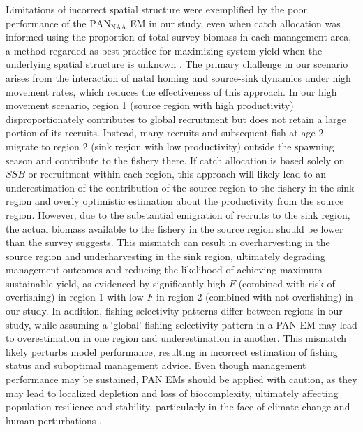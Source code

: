 \documentclass[
  12pt,
]{article}
\begin{document}
Limitations of incorrect spatial structure were exemplified by the poor
performance of the \(\text{PAN}_{\scriptscriptstyle \text{NAA}}\) EM in
our study, even when catch allocation was informed using the proportion
of total survey biomass in each management area, a method regarded as
best practice for maximizing system yield when the underlying spatial
structure is unknown \citep{Bosley2019}. The primary challenge in our
scenario arises from the interaction of natal homing and source-sink
dynamics under high movement rates, which reduces the effectiveness of
this approach. In our high movement scenario, region 1 (source region
with high productivity) disproportionately contributes to global
recruitment but does not retain a large portion of its recruits.
Instead, many recruits and subsequent fish at age 2+ migrate to region 2
(sink region with low productivity) outside the spawning season and
contribute to the fishery there. If catch allocation is based solely on
\(SSB\) or recruitment within each region, this approach will likely
lead to an underestimation of the contribution of the source region to
the fishery in the sink region and overly optimistic estimation about
the productivity from the source region. However, due to the substantial
emigration of recruits to the sink region, the actual biomass available
to the fishery in the source region should be lower than the survey
suggests. This mismatch can result in overharvesting in the source
region and underharvesting in the sink region, ultimately degrading
management outcomes and reducing the likelihood of achieving maximum
sustainable yield, as evidenced by significantly high \(F\) (combined
with risk of overfishing) in region 1 with low \(F\) in region 2
(combined with not overfishing) in our study. In addition, fishing
selectivity patterns differ between regions in our study, while assuming
a `global' fishing selectivity pattern in a PAN EM may lead to
overestimation in one region and underestimation in another. This
mismatch likely perturbs model performance, resulting in incorrect
estimation of fishing status and suboptimal management advice. Even
though management performance may be sustained, PAN EMs should be
applied with caution, as they may lead to localized depletion
\citep{Punt2015, Bosley2019, Bosley2022} and loss of biocomplexity,
ultimately affecting population resilience and stability, particularly
in the face of climate change and human perturbations \citep{Kerr2017}.
\end{document}
